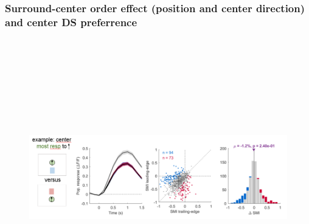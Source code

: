 % 
%    
%           
%
%        

\subsubsection{Surround-center order effect (position and center direction) and center DS preferrence}

\begin{figure}[H] \centering \includegraphics[width=12cm,height=12cm,keepaspectratio]{Figures/7.Results/finalPopulation/sel/diagrams/23.png} 
\end{figure}

